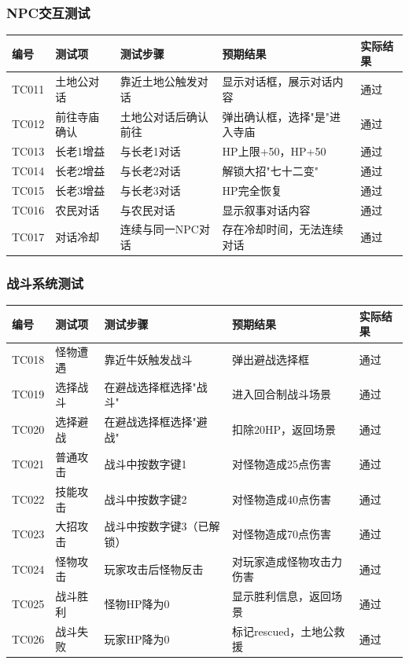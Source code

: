 \documentclass[a4paper,12pt]{article}
\begin{document}
\subsubsection{NPC交互测试}
\begin{longtable}{|p{1.5cm}|p{3cm}|p{4cm}|p{4cm}|p{2cm}|}
\hline
编号 & 测试项 & 测试步骤 & 预期结果 & 实际结果 \\
\hline
TC011 & 土地公对话 & 靠近土地公触发对话 & 显示对话框，展示对话内容 & 通过 \\
\hline
TC012 & 前往寺庙确认 & 土地公对话后确认前往 & 弹出确认框，选择"是"进入寺庙 & 通过 \\
\hline
TC013 & 长老1增益 & 与长老1对话 & HP上限+50，HP+50 & 通过 \\
\hline
TC014 & 长老2增益 & 与长老2对话 & 解锁大招"七十二变" & 通过 \\
\hline
TC015 & 长老3增益 & 与长老3对话 & HP完全恢复 & 通过 \\
\hline
TC016 & 农民对话 & 与农民对话 & 显示叙事对话内容 & 通过 \\
\hline
TC017 & 对话冷却 & 连续与同一NPC对话 & 存在冷却时间，无法连续对话 & 通过 \\
\hline
\end{longtable}

\subsubsection{战斗系统测试}
\begin{longtable}{|p{1.5cm}|p{3cm}|p{4cm}|p{4cm}|p{2cm}|}
\hline
编号 & 测试项 & 测试步骤 & 预期结果 & 实际结果 \\
\hline
TC018 & 怪物遭遇 & 靠近牛妖触发战斗 & 弹出避战选择框 & 通过 \\
\hline
TC019 & 选择战斗 & 在避战选择框选择"战斗" & 进入回合制战斗场景 & 通过 \\
\hline
TC020 & 选择避战 & 在避战选择框选择"避战" & 扣除20HP，返回场景 & 通过 \\
\hline
TC021 & 普通攻击 & 战斗中按数字键1 & 对怪物造成25点伤害 & 通过 \\
\hline
TC022 & 技能攻击 & 战斗中按数字键2 & 对怪物造成40点伤害 & 通过 \\
\hline
TC023 & 大招攻击 & 战斗中按数字键3（已解锁） & 对怪物造成70点伤害 & 通过 \\
\hline
TC024 & 怪物攻击 & 玩家攻击后怪物反击 & 对玩家造成怪物攻击力伤害 & 通过 \\
\hline
TC025 & 战斗胜利 & 怪物HP降为0 & 显示胜利信息，返回场景 & 通过 \\
\hline
TC026 & 战斗失败 & 玩家HP降为0 & 标记rescued，土地公救援 & 通过 \\
\hline
\end{longtable}
\end{document}
